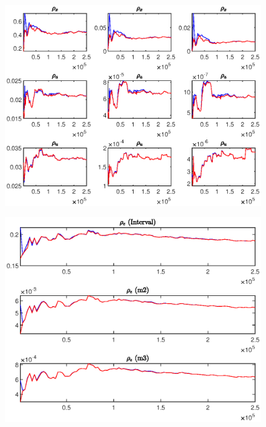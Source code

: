 \documentclass[11pt,preprint, authoryear]{elsarticle}
\let\origfigure\figure
\let\endorigfigure\endfigure
\renewenvironment{figure}[1][2] {
    \expandafter\origfigure\expandafter[H]
} {
    \endorigfigure
}
\numberwithin{equation}{section}
\numberwithin{figure}{section}
\numberwithin{table}{section}
\begin{document}
\begin{figure}
\begin{subfigure}[H]{0.49\textwidth}
         \includegraphics[width=\textwidth]{code/mcmc_u5}
     \end{subfigure}
      \begin{subfigure}[H]{0.49\textwidth}
         \centering
         \includegraphics[width=\textwidth]{code/mcmc_u6}
     \end{subfigure}
        \caption{MCMC univariate diagnostics of structural parameters for extended sample under estimated the Taylor rule (\ref{s1}) [@brooks1998]. For each parameter, the first column shows the convergence diagnostics for the 80 per cent interval. The second and third columns shows the estimates of the second and third central moments (m2 and m3), respectively. The red line shows the 80 per cent quantile range based on the 25 000 pooled draws from all sequences and the blue line shows the mean interval range based on the draws of the individual sequences.}
        \label{mcmcu1}
\end{figure}
\end{document}
